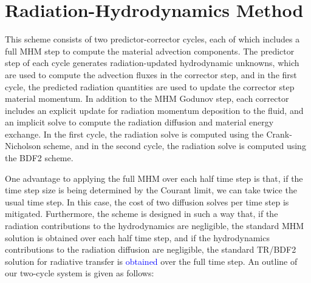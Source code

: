 \documentclass[preprint,12pt]{elsarticle}
\newcommand{\URL}[1]{{\textcolor{blue}{#1}}}
\begin{document}
\section{Radiation-Hydrodynamics Method}
\label{sec:Method}


This scheme consists of two predictor-corrector cycles, each of which includes a full MHM step to compute the material advection components.  The predictor step of each cycle generates radiation-updated hydrodynamic unknowns, which are used to compute the advection fluxes in the corrector step, and in the first cycle, the predicted radiation quantities are used to update the corrector step material momentum.  In addition to the MHM Godunov step, each corrector includes an explicit update for radiation momentum deposition to the fluid, and an implicit solve to compute the radiation diffusion and material energy exchange.  In the first cycle, the radiation solve is computed using the Crank-Nicholson scheme, and in the second cycle, the radiation solve is computed using the BDF2 scheme. 

One advantage to applying the full MHM over each half time step is that, if the time step size is being determined by the Courant limit, we can take twice the usual time step.  In this case, the cost of two diffusion solves per time step is mitigated.  Furthermore, the scheme is designed in such a way that, if the radiation contributions to the hydrodynamics are negligible, the standard MHM solution is obtained over each half time step, and if the hydrodynamics contributions to the radiation diffusion are negligible, the standard TR/BDF2 solution for radiative transfer is \URL{obtained} over the full time step.  An outline of our two-cycle system is given as follows:
\end{document}
